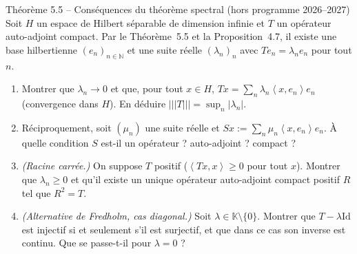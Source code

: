 \documentclass[11pt,a4paper]{article}
\newcommand{\N}{\mathbb{N}}
\newcommand{\K}{\mathbb{K}}
\newcommand{\opnorm}[1]{|\!|\!|#1|\!|\!|}
\newcommand{\ps}[2]{\left\langle #1,#2\right\rangle}
\theoremstyle{definition}
\begin{document}
\begin{exo}{Théorème 5.5 -- Conséquences du théorème spectral (hors programme 2026--2027)}
Soit $H$ un espace de Hilbert séparable de dimension infinie et $T$ un opérateur auto-adjoint compact. Par le Théorème~5.5 et la Proposition~4.7, il existe une base hilbertienne $(e_n)_{n\in\N}$ et une suite réelle $(\lambda_n)_n$ avec $Te_n=\lambda_ne_n$ pour tout $n$.
\begin{enumerate}[label=(\alph*)]
  \item Montrer que $\lambda_n\to0$ et que, pour tout $x\in H$, $Tx=\sum_n\lambda_n\ps x{e_n}e_n$ (convergence dans $H$). En déduire $\opnorm T=\sup_n|\lambda_n|$.
  \item Réciproquement, soit $(\mu_n)$ une suite réelle et $Sx:=\sum_n\mu_n\ps x{e_n}e_n$. À quelle condition $S$ est-il un opérateur ? auto-adjoint ? compact ?
  \item \emph{(Racine carrée.)} On suppose $T$ positif ($\ps{Tx}x\ge0$ pour tout $x$). Montrer que $\lambda_n\ge0$ et qu'il existe un unique opérateur auto-adjoint compact positif $R$ tel que $R^2=T$.
  \item \emph{(Alternative de Fredholm, cas diagonal.)} Soit $\lambda\in\K\setminus\{0\}$. Montrer que $T-\lambda\mathrm{Id}$ est injectif si et seulement s'il est surjectif, et que dans ce cas son inverse est continu. Que se passe-t-il pour $\lambda=0$ ?
\end{enumerate}
\end{exo}
\end{document}
